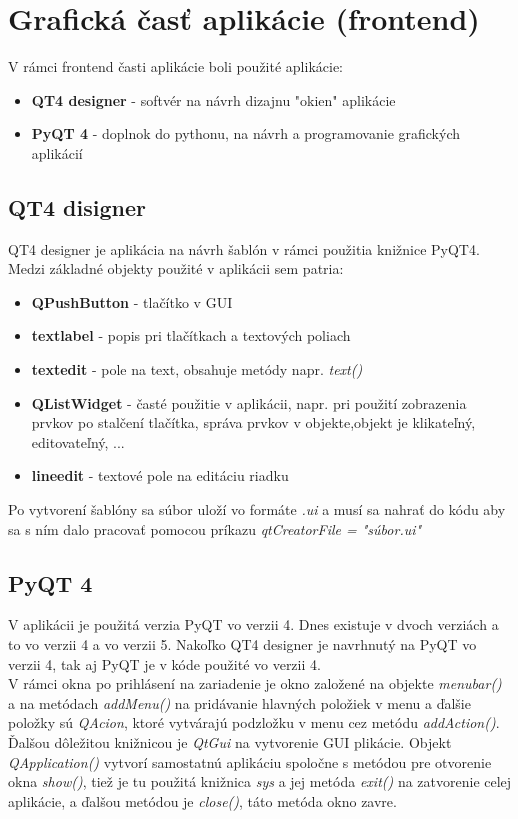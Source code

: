 \chapter{Grafická časť aplikácie (frontend)}
V rámci frontend časti aplikácie boli použité aplikácie:\begin{itemize}
\item \textbf{QT4 designer} - softvér na návrh dizajnu "okien" aplikácie
\item \textbf{PyQT 4} - doplnok do pythonu, na návrh a programovanie grafických aplikácií
\end{itemize} 
\section{QT4 disigner}
QT4 designer je aplikácia na návrh šablón v rámci použitia knižnice PyQT4. Medzi základné objekty použité v aplikácii sem patria:
\begin{itemize}
\item \textbf{QPushButton} - tlačítko v GUI
\item \textbf{textlabel} - popis pri tlačítkach a textových poliach
\item \textbf{textedit} - pole na text, obsahuje metódy napr. \textit{text()}
\item \textbf{QListWidget} - časté použitie v aplikácii, napr. pri použití zobrazenia prvkov po stalčení tlačítka, správa prvkov v objekte,objekt je klikateľný, editovateľný, ...
\item \textbf{lineedit} - textové pole na editáciu riadku
\end{itemize} 
Po vytvorení šablóny sa súbor uloží vo formáte \textit{.ui} a musí sa nahrať do kódu aby sa s ním dalo pracovať pomocou príkazu \textit{qtCreatorFile = "súbor.ui"}
\section{PyQT 4}
V aplikácii je použitá verzia PyQT vo verzii 4. Dnes existuje v dvoch verziách a to vo verzii 4 a vo verzii 5. Nakoľko QT4 designer je navrhnutý na PyQT vo verzii 4, tak aj PyQT je v kóde použité vo verzii 4. \\
V rámci okna po prihlásení na zariadenie je okno založené na objekte \textit{menubar()} a na metódach \textit{addMenu()} na pridávanie hlavných položiek v menu a ďalšie položky sú \textit{QAcion}, ktoré vytvárajú podzložku v menu cez metódu \textit{addAction()}. Ďalšou dôležitou knižnicou je \textit{QtGui} na vytvorenie GUI plikácie. Objekt \textit{QApplication()} vytvorí samostatnú aplikáciu spoločne s metódou pre otvorenie okna \textit{show()}, tiež je tu použitá knižnica \textit{sys} a jej metóda \textit{exit()} na zatvorenie celej aplikácie,  a ďalšou metódou je \textit{close()}, táto metóda okno zavre.
